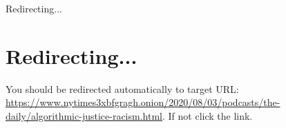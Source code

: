 Redirecting...

\hypertarget{redirecting}{%
\section{Redirecting...}\label{redirecting}}

You should be redirected automatically to target URL:
\url{https://www.nytimes3xbfgragh.onion/2020/08/03/podcasts/the-daily/algorithmic-justice-racism.html}.
If not click the link.
